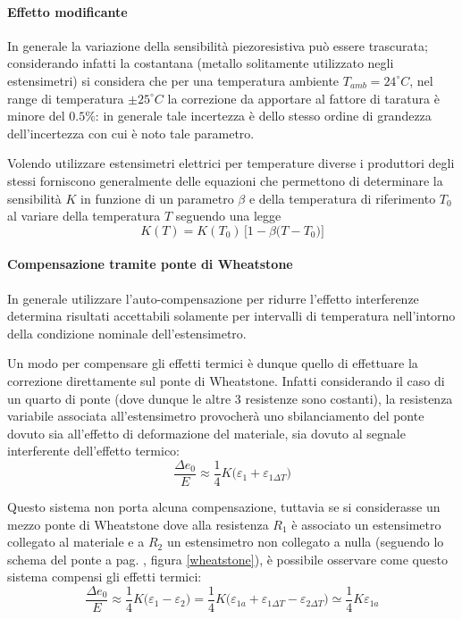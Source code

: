 		\paragraph{Effetto modificante} In generale la variazione della sensibilità piezoresistiva può essere trascurata; considerando infatti la costantana (metallo solitamente utilizzato negli estensimetri) si considera che per una temperatura ambiente $T_{amb} = 24^\circ C$, nel range di temperatura $\pm 25^\circ C$ la correzione da apportare al fattore di taratura è minore del $0.5\%$: in generale tale incertezza è dello stesso ordine di grandezza dell'incertezza con cui è noto tale parametro.
		
		Volendo utilizzare estensimetri elettrici per temperature diverse i produttori degli stessi forniscono generalmente delle equazioni che permettono di determinare la sensibilità $K$ in funzione di un parametro $\beta$ e della temperatura di riferimento $T_0$ al variare della temperatura $T$ seguendo una legge
		\[ K(T) = K(T_0) \, \Big[1 - \beta \big(T-T_0\big)\Big] \]
		
		\paragraph{Compensazione tramite ponte di Wheatstone} In generale utilizzare l'auto-compensazione per ridurre l'effetto interferenze determina risultati accettabili solamente per intervalli di temperatura nell'intorno della condizione nominale dell'estensimetro. 
		
		Un modo per compensare gli effetti termici è dunque quello di effettuare la correzione direttamente sul ponte di Wheatstone. Infatti considerando il caso di un quarto di ponte (dove dunque le altre 3 resistenze sono costanti), la resistenza variabile associata all'estensimetro provocherà uno sbilanciamento del ponte dovuto sia all'effetto di deformazione del materiale, sia dovuto al segnale interferente dell'effetto termico:
		\[ \frac{\Delta e_0}{E} \approx \frac 1 4 K \big(\varepsilon_1 + \varepsilon_{1\Delta T}\big)  \]
		
		Questo sistema non porta alcuna compensazione, tuttavia se si considerasse un mezzo ponte di Wheatstone dove alla resistenza $R_1$ è associato un estensimetro collegato al materiale e a $R_2$ un estensimetro non collegato a nulla (seguendo lo schema del ponte a pag. \pageref{wheatstone}, figura \ref{wheatstone}), è possibile osservare come questo sistema compensi gli effetti termici:
		\[ \frac{\Delta e_0}E \approx \frac 1 4 K \big(\varepsilon_1 - \varepsilon_2\big) = \frac 1 4 K \big(\varepsilon_{1a} + \varepsilon_{1\Delta T} - \varepsilon_{2\Delta T}\big) \simeq \frac 1 4 K \varepsilon_{1a} \]
		

